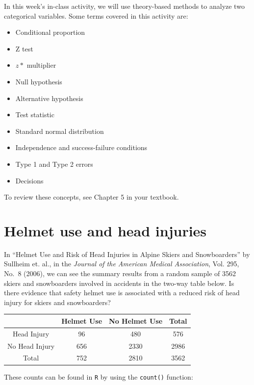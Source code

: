 \documentclass[
]{report}
\begin{document}
In this week's in-class activity, we will use theory-based methods to analyze two categorical variables. Some terms covered in this activity are:

\begin{itemize}
\item
  Conditional proportion
\item
  Z test
\item
  \(z*\) multiplier
\item
  Null hypothesis
\item
  Alternative hypothesis
\item
  Test statistic
\item
  Standard normal distribution
\item
  Independence and success-failure conditions
\item
  Type 1 and Type 2 errors
\item
  Decisions
\end{itemize}

To review these concepts, see Chapter 5 in your textbook.

\newpage

\hypertarget{helmet-use-and-head-injuries}{%
\section{Helmet use and head injuries}\label{helmet-use-and-head-injuries}}

In ``Helmet Use and Risk of Head Injuries in Alpine Skiers and Snowboarders'' by Sullheim et. al., in the \emph{Journal of the American Medical Association}, Vol. 295, No.~8 (2006), we can see the summary results from a random sample of 3562 skiers and snowboarders involved in accidents in the two-way table below. Is there evidence that safety helmet use is associated with a reduced risk of head injury for skiers and snowboarders?

\begin{longtable}[]{@{}cccc@{}}
\toprule
& Helmet Use & No Helmet Use & Total\tabularnewline
\midrule
\endhead
Head Injury & 96 & 480 & 576\tabularnewline
No Head Injury & 656 & 2330 & 2986\tabularnewline
Total & 752 & 2810 & 3562\tabularnewline
\bottomrule
\end{longtable}

These counts can be found in \texttt{R} by using the \texttt{count()} function:
\end{document}
